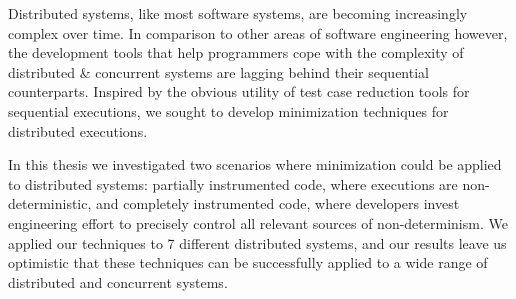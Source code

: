 Distributed systems, like most software systems, are becoming increasingly complex over time.
In comparison to other areas of software engineering however, the development
tools that help programmers cope with the complexity of distributed \&
concurrent systems are lagging behind their sequential counterparts.
Inspired by the obvious utility of test case reduction tools for sequential
executions, we sought to develop
minimization techniques for distributed executions.

In this thesis we investigated two scenarios where minimization could be applied to
distributed systems: partially instrumented code, where executions are non-deterministic, and
completely instrumented code, where developers invest engineering effort
to precisely control all relevant sources of non-determinism. We applied our
techniques to 7 different distributed systems, and our results
leave us optimistic that these techniques can be
successfully applied to a wide range of distributed and concurrent systems.




